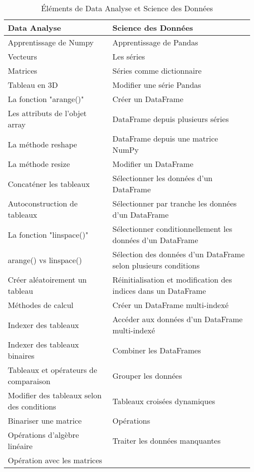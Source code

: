 \begin{table}[h]
    \centering
    \begin{tabular}{|l|l|}
        \hline
        \textbf{Data Analyse} & \textbf{Science des Données} \\ \hline
        Apprentissage de Numpy & Apprentissage de Pandas \\ \hline
        Vecteurs & Les séries \\ \hline
        Matrices & Séries comme dictionnaire \\ \hline
        Tableau en 3D & Modifier une série Pandas \\ \hline
        La fonction "arange()" & Créer un DataFrame \\ \hline
        Les attributs de l'objet array & DataFrame depuis plusieurs séries \\ \hline
        La méthode reshape & DataFrame depuis une matrice NumPy \\ \hline
        La méthode resize & Modifier un DataFrame \\ \hline
        Concaténer les tableaux & Sélectionner les données d'un DataFrame \\ \hline
        Autoconstruction de tableaux & Sélectionner par tranche les données d'un DataFrame \\ \hline
        La fonction "linspace()" & Sélectionner conditionnellement les données d'un DataFrame \\ \hline
        arange() vs linspace() & Sélection des données d'un DataFrame selon plusieurs conditions \\ \hline
        Créer aléatoirement un tableau & Réinitialisation et modification des indices dans un DataFrame \\ \hline
        Méthodes de calcul & Créer un DataFrame multi-indexé \\ \hline
        Indexer des tableaux & Accéder aux données d'un DataFrame multi-indexé \\ \hline
        Indexer des tableaux binaires & Combiner les DataFrames \\ \hline
        Tableaux et opérateurs de comparaison & Grouper les données \\ \hline
        Modifier des tableaux selon des conditions & Tableaux croisées dynamiques \\ \hline
        Binariser une matrice & Opérations \\ \hline
        Opérations d'algèbre linéaire & Traiter les données manquantes \\ \hline
        Opération avec les matrices &  \\ \hline
    \end{tabular}
    \caption{Éléments de Data Analyse et Science des Données}
    \label{tab:data_analysis_science}
\end{table}